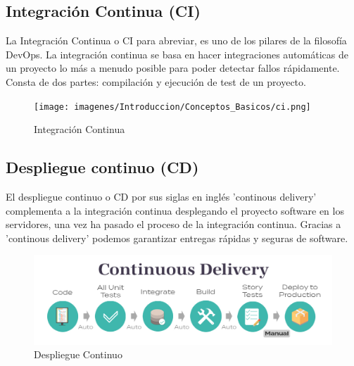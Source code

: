 	\subsection{Integración Continua (CI)}
		\begin{text}
			La Integración Continua o CI para abreviar, es uno de los pilares de la filosofía DevOps. La integración continua se basa en hacer integraciones automáticas de un proyecto lo más a menudo posible para poder detectar fallos rápidamente. Consta de dos partes: compilación y ejecución de test de un proyecto.
			
			
			\begin{figure}[!hbt]
				\centering
				\texttt{[image: imagenes/Introduccion/Conceptos\_Basicos/ci.png]}
				\caption[Integración Continua]{Integración Continua \cite{Alcanzan90:online} }
				\label{integracion_continua} 
			\end{figure}
		\end{text}
	\subsection{Despliegue continuo (CD)}
		\begin{text}
			El despliegue continuo o CD por sus siglas en inglés 'continous delivery' complementa a la integración continua desplegando el proyecto software en los servidores, una vez ha pasado el proceso de la integración continua. Gracias a 'continous delivery' podemos garantizar entregas rápidas y seguras de software.
			
			\begin{figure}[!hbt]
				\centering
				\includegraphics[scale=0.35]{imagenes/Introduccion/Conceptos_Basicos/CD.png}
				\caption[Despliegue Continuo]{Despliegue Continuo \cite{continuo84:online}}
				\label{despligue_continuo} 
			\end{figure}
		\end{text}
